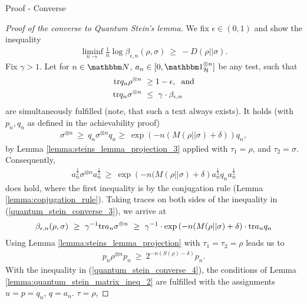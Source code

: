 \begin{subsection}{Proof - Converse}
  \begin{proof}[Proof of the converse to Quantum Stein's lemma]
  We fix $\epsilon \in (0,1)$ and show the inequality 
  \begin{align*}
   \underset{n \rightarrow}{\liminf} \frac{1}{n} \log \beta_{\epsilon, n}(\rho,\sigma) \ \geq \ -D(\rho||\sigma).
  \end{align*}
   Fix $\gamma > 1$. Let for $n \in \bbmN$, $a_n \in [0, \bbmeins_\cH^{\otimes n}]$ be any test, such that 
   \begin{align*}
    \mathrm{tr} q_n \rho^{\otimes n} \ & \geq  1 - \epsilon, \hspace{.2cm} \text{and}  \\
    \mathrm{tr} q_n \sigma^{\otimes n} \ & \leq \ \gamma \cdot \beta_{\epsilon,n}
   \end{align*}
   are simultaneously fulfilled (note, that such a text always exists). It holds (with $p_n, q_n$ as defined in the achievability proof)
   \begin{align*}
    \sigma^{\otimes n} \ 
    \geq \ q_n \sigma^{\otimes n} q_n
    \geq \ \exp\left(-n (M(\rho||\sigma) + \delta) \right) q_{n},
   \end{align*}
   by Lemma \ref{lemma:steins_lemma_projection_3} applied with $\tau_1 = \rho$, and $\tau_2 = \sigma$. Consequently,
   \begin{align}
    a_n^{\frac{1}{2}} \sigma^{\otimes n} a_n^{\frac{1}{2}} \ \geq \ \exp\left(-n ( M(\rho||\sigma) + \delta \right) a_n^{\frac{1}{2}} q_n a_n^{\frac{1}{2}} \label{quantum_stein_converse_3}
   \end{align}
   does hold, where the first inequality is by the conjugation rule (Lemma \ref{lemma:conjugation_rule}). Taking traces on both sides of the inequality in (\ref{quantum_stein_converse_3}), we arrive at
  \begin{align*}
    \beta_{\epsilon, n}(\rho, \sigma) \ \geq \ \gamma^{-1} \mathrm{tr} a_n \sigma^{\otimes n} \ \geq \  \gamma^{-1} \cdot \exp\left(-n (M(\rho||\sigma) + \delta \right) \cdot \mathrm{tr} a_n q_n
   \end{align*}
  Using Lemma \ref{lemma:steins_lemma_projection} with $\tau_1 = \tau_2 = \rho$ leads us to 
  \begin{align}
   p_n \rho^{\otimes n} p_n \ \geq \ 2^{-n (S(\rho) - \delta)} p_n. \label{quantum_stein_converse_4}
  \end{align}
  With the inequality in (\ref{quantum_stein_converse_4}), the conditions of Lemma \ref{lemma:quantum_stein_matrix_ineq_2} are fulfilled  with the assignments $u = p = q_n$, $q = a_n$. $\tau = \rho$, 

\end{proof}
\end{subsection}
